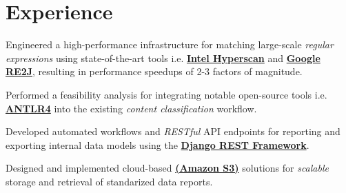 \documentclass[]{openfont}
\begin{document}
\hfill
\begin{minipage}[t]{0.65\textwidth}


    \section{Experience}
    \vspace{\topsep}
    \begin{tightemize}
        \item Engineered a high-performance infrastructure for matching large-scale \textit{regular expressions} using state-of-the-art tools i.e. \href{https://www.intel.com/content/www/us/en/developer/articles/technical/introduction-to-hyperscan.html}{\textbf{Intel Hyperscan}} and \href{https://github.com/google/re2j}{\textbf{Google RE2J}}, resulting in performance speedups of 2-3 factors of magnitude.
        \item Performed a feasibility analysis for integrating notable open-source tools i.e. \href{https://www.antlr.org/}{\textbf{ANTLR4}} into the existing \textit{content classification} workflow.
    \end{tightemize}
    \sectionsep

    \begin{tightemize}
        \item Developed automated workflows and \textit{RESTful} API endpoints for reporting and exporting internal data models using the \textbf{\href{https://www.django-rest-framework.org/}{Django REST Framework}}.
        \item Designed and implemented cloud-based \href{https://aws.amazon.com/s3/}{\textbf{(Amazon S3)}} solutions for \textit{scalable} storage and retrieval of standarized data reports.
    \end{tightemize}
    \sectionsep


\end{minipage}
\end{document}

